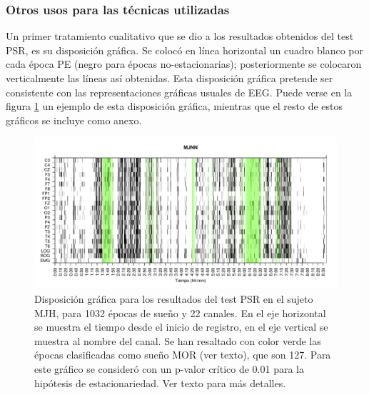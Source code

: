 \subsubsection{Otros usos para las t\'ecnicas utilizadas}


Un primer tratamiento cualitativo que se dio a los resultados obtenidos del test PSR, es su
disposici\'on gr\'afica.
Se coloc\'o en l\'inea horizontal un cuadro blanco por cada
\'epoca PE (negro para \'epocas no-estacionarias);
posteriormente se colocaron verticalmente las
l\'ineas as\'i obtenidas.
Esta disposici\'on gr\'afica pretende ser consistente con las representaciones gr\'aficas
usuales de EEG.
Puede verse en la figura \ref{ejemplo1} un ejemplo de esta disposici\'on gr\'afica, mientras
que el resto de estos gr\'aficos se incluye como anexo.

\begin{figure}
\includegraphics[width=\textwidth]{MJNNVIGILOS_127_mor127_tot1032_esttotal.pdf} 
\caption{Disposici\'on gr\'afica para los resultados del test PSR en el sujeto MJH, 
para 1032 \'epocas de sue\~no y 22 canales. 
En el eje horizontal se muestra el tiempo desde el inicio de registro, en el eje vertical se muestra al 
nombre del canal. 
Se han resaltado con color verde las \'epocas clasificadas como sue\~no MOR (ver texto), que son 127.
Para este gr\'afico se consider\'o con un p-valor cr\'itico de 0.01 para la hip\'otesis
de estacionariedad. Ver texto para m\'as detalles.}
\label{ejemplo1}
\end{figure}

